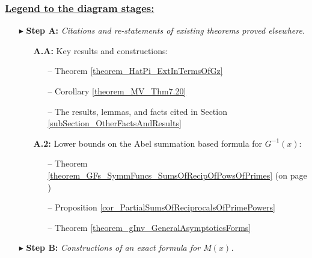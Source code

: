 \documentclass[11pt,reqno,a4letter]{article}
\numberwithin{figure}{section}
\numberwithin{table}{section}
\theoremstyle{plain}
\numberwithin{theorem}{section}
\theoremstyle{definition}
\begin{document}
\subsubsection*{\underline{Legend to the diagram stages:}} 
\begin{itemize}[noitemsep,topsep=0pt,leftmargin=0.95in]

\item[$\blacktriangleright$ \textbf{Step A:}] \textit{Citations and re-statements of existing theorems proved elsewhere. }
     \begin{itemize}[noitemsep,topsep=0pt,leftmargin=0.35in] 
     \item[\textbf{A.A:}] Key results and constructions: 
          \begin{itemize}[noitemsep,topsep=0pt,leftmargin=0.25in]
          \item[--] \small{Theorem \ref{theorem_HatPi_ExtInTermsOfGz}} 
          \item[--] \small{Corollary \ref{theorem_MV_Thm7.20}} 
          \item[--] \small{The results, lemmas, and facts cited in Section \ref{subSection_OtherFactsAndResults}}
          \end{itemize} 
     \item[\textbf{A.2:}] Lower bounds on the Abel summation based formula for $G^{-1}(x)$: 
          \begin{itemize}[noitemsep,topsep=0pt,leftmargin=0.25in]
          \item[--] \small{Theorem \ref{theorem_GFs_SymmFuncs_SumsOfRecipOfPowsOfPrimes} 
                    (on page \pageref{proofOf_theorem_GFs_SymmFuncs_SumsOfRecipOfPowsOfPrimes})} 
          \item[--] \small{Proposition \ref{cor_PartialSumsOfReciprocalsOfPrimePowers}} 
          \item[--] \small{Theorem \ref{theorem_gInv_GeneralAsymptoticsForms}} 
          \end{itemize} 
     \end{itemize} 
\item[$\blacktriangleright$ \textbf{Step B:}] \textit{Constructions of an exact formula for $M(x)$. } 

\end{itemize}
\end{document}
